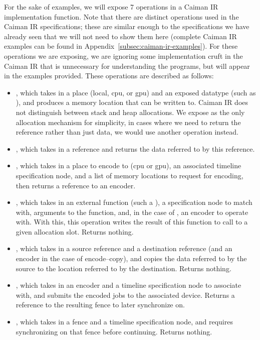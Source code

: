 For the sake of examples, we will expose 7 operations in a Caiman IR implementation function.  Note that there are distinct operations used in the Caiman IR specifications; these are similar enough to the specifications we have already seen that we will not need to show them here (complete Caiman IR examples can be found in Appendix~\ref{subsec:caiman-ir-examples}).  For these operations we are exposing, we are ignoring some implementation cruft in the Caiman IR that is unnecessary for understanding the programs, but will appear in the examples provided.  These operations are described as follows:
%
\begin{itemize}
\item {}, which takes in a place (local, cpu, or gpu) and an exposed datatype (such as ), and produces a memory location that can be written to.  Caiman IR does not distinguish between stack and heap allocations.  We expose  as the only allocation mechanism for simplicity, in cases where we need to return the reference rather than just data, we would use another operation instead.
\item {}, which takes in a reference and returns the data referred to by this reference.
\item {}, which takes in a place to encode to (cpu or gpu), an associated timeline specification node, and a list of memory locations to request for encoding, then returns a reference to an encoder.
\item {}, which takes in an external function (such a ), a specification node to match with, arguments to the function, and, in the case of , an encoder to operate with.  With this, this operation writes the result of this function to call to a given allocation slot.  Returns nothing.
\item {}, which takes in a source reference and a destination reference (and an encoder in the case of encode--copy), and copies the data referred to by the source to the location referred to by the destination.  Returns nothing.
\item {}, which takes in an encoder and a timeline specification node to associate with, and submits the encoded jobs to the associated device.  Returns a reference to the resulting fence to later synchronize on.
\item {}, which takes in a fence and a timeline specification node, and requires synchronizing on that fence before continuing.  Returns nothing.
\end{itemize}
